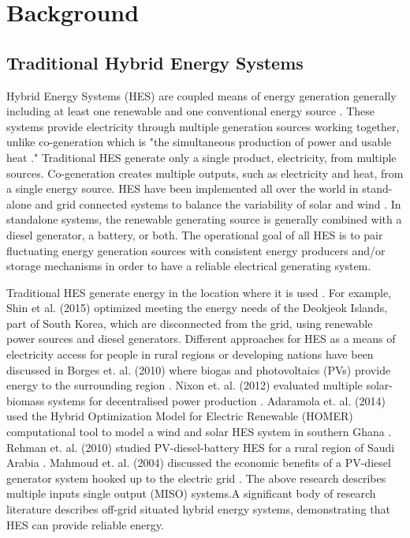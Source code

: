 \documentclass[12pt]{UIdahoMastersThesis}
\begin{document}
\chapter{Background}
\section{Traditional Hybrid Energy Systems}
Hybrid Energy Systems (HES) are coupled means of energy generation generally including at least one renewable and one conventional energy source \cite {Ibrahim2011}. These systems provide electricity through multiple generation sources working together, unlike co-generation which is "the simultaneous production of power and usable heat \cite{Rosen2005}." Traditional HES generate only a single product, electricity, from multiple sources. Co-generation creates multiple outputs, such as electricity and heat, from a single energy source. HES have been implemented all over the world in stand-alone and grid connected systems to balance the variability of solar and wind \cite {Garcia2015, Qi2014, Shin2015, Nixon2012, Adaramola2014, Goodbody2013, BorgesNeto2010, McGowan1996}. In standalone systems, the renewable generating source is generally combined with a diesel generator, a battery, or both. The operational goal of all HES is to pair fluctuating energy generation sources with consistent energy producers and/or storage mechanisms in order to have a reliable electrical generating system. 

Traditional HES generate energy in the location where it is used \cite {Shin2015, Nixon2012, Adaramola2014, Goodbody2013, McGowan1996}. For example, Shin et al. (2015) optimized meeting the energy needs of the Deokjeok Islands, part of South Korea, which are disconnected from the grid, using renewable power sources and diesel generators. Different approaches for HES as a means of electricity access for people in rural regions or developing nations have been discussed in Borges et. al. (2010) where biogas and photovoltaics (PVs) provide energy to the surrounding region \cite{BorgesNeto2010}. Nixon et. al. (2012) evaluated multiple solar-biomass systems for decentralised power production \cite{Nixon2012}. Adaramola et. al. (2014) used the Hybrid Optimization Model for Electric Renewable (HOMER) computational tool to model a wind and solar HES system in southern Ghana \cite{Adaramola2014}. Rehman et. al. (2010) studied PV-diesel-battery HES for a rural region of Saudi Arabia \cite{Rehman2010}. Mahmoud et. al. (2004) discussed the economic benefits of a PV-diesel generator system hooked up to the electric grid \cite {Mahmoud2004}. The above research describes multiple inputs single output (MISO) systems\cite{Garcia2013}.A significant body of research literature describes off-grid situated hybrid energy systems, demonstrating that HES can provide reliable energy. 
\end{document}
